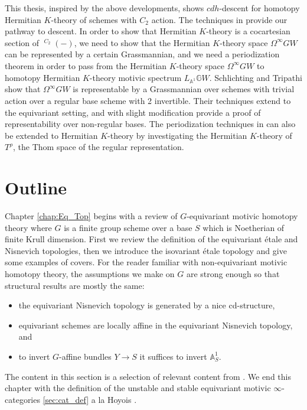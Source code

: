 \documentclass[edeposit,fullpage]{uiucthesis2009}
\newcommand{\mbb}{\mathbb}
\DeclareMathOperator{\SH}{\underline{SH}}
\theoremstyle{plain}
\numberwithin{lemma}{section}
\theoremstyle{definition}
\begin{document}
This thesis, inspired by the above developments, shows $cdh$-descent
for homotopy Hermitian $K$-theory of schemes with $C_2$ action. The
techniques in \cite{cdhdesc} provide our pathway to descent. In order
to show that Hermitian $K$-theory is a cocartesian section of
$\SH^{C_2}(-)$, we need to show that the Hermitian $K$-theory space
$\Omega^\infty GW$ can be represented by a certain Grassmannian, and
we need a periodization theorem in order to pass from the Hermitian
$K$-theory space $\Omega^\infty
GW$ to homotopy Hermitian $K$-theory motivic spectrum $L_{\mbb
  A^1}\mbb GW$. Schlichting and Tripathi \cite{SchTri} show that
$\Omega^\infty GW$ is representable by a Grassmannian over schemes
with trivial action over a regular base scheme with 2 invertible. Their techniques extend to the equivariant
setting, and with slight modification provide a proof of
representability over non-regular bases. The periodization techniques
in \cite{cdhdesc} can also be extended to Hermitian $K$-theory by
investigating the Hermitian $K$-theory of $T^\rho$, the Thom
space of the regular representation.

\section{Outline}

Chapter \ref{chap:Eq_Top} begins with a review of $G$-equivariant motivic
homotopy theory where $G$ is a finite group scheme over a base $S$
which is Noetherian of finite Krull dimension. First we review the definition of the equivariant
\'etale and Nisnevich topologies, then we introduce the isovariant
\'etale topology and give some examples of covers. For the reader
familiar with non-equivariant motivic homotopy theory, the assumptions
we make on $G$ are strong enough so that structural results are mostly
the same:
\begin{itemize}
\item the equivariant Nisnevich topology is generated by a nice cd-structure,
\item equivariant schemes are locally affine in the equivariant
  Nisnevich topology, and
\item to invert $G$-affine bundles $Y \rightarrow S$ it suffices to
  invert $\mbb A_S^1$.
\end{itemize}

The content in this section is a selection of relevant content from
\cite{GrpSchHell}. We end this chapter with the definition of the unstable and stable
equivariant motivic $\infty$-categories \ref{sec:cat_def} a la Hoyois
\cite{HoyoisSixOp}.
\end{document}
